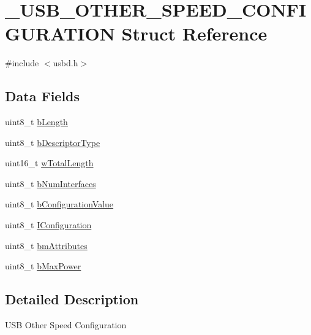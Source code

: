 \hypertarget{struct__USB__OTHER__SPEED__CONFIGURATION}{\section{\-\_\-\-U\-S\-B\-\_\-\-O\-T\-H\-E\-R\-\_\-\-S\-P\-E\-E\-D\-\_\-\-C\-O\-N\-F\-I\-G\-U\-R\-A\-T\-I\-O\-N Struct Reference}
\label{struct__USB__OTHER__SPEED__CONFIGURATION}
}


{\ttfamily \#include $<$usbd.\-h$>$}

\subsection*{Data Fields}
\begin{DoxyCompactItemize}
\item 
uint8\-\_\-t \hyperlink{struct__USB__OTHER__SPEED__CONFIGURATION_a8c70170e1f5bfcc1d77a8357a254050c}{b\-Length}
\item 
uint8\-\_\-t \hyperlink{struct__USB__OTHER__SPEED__CONFIGURATION_ab8d0e53addf9904fbcad68ae45399805}{b\-Descriptor\-Type}
\item 
uint16\-\_\-t \hyperlink{struct__USB__OTHER__SPEED__CONFIGURATION_af624dbc10570cb8fbca7323c6bffcb70}{w\-Total\-Length}
\item 
uint8\-\_\-t \hyperlink{struct__USB__OTHER__SPEED__CONFIGURATION_a7ebb3afc825c1940c5ff1c5b2907ac38}{b\-Num\-Interfaces}
\item 
uint8\-\_\-t \hyperlink{struct__USB__OTHER__SPEED__CONFIGURATION_a7e753546b3365270dd7904762c1cd104}{b\-Configuration\-Value}
\item 
uint8\-\_\-t \hyperlink{struct__USB__OTHER__SPEED__CONFIGURATION_a69e71d4b33b56469a4388c07e811e390}{I\-Configuration}
\item 
uint8\-\_\-t \hyperlink{struct__USB__OTHER__SPEED__CONFIGURATION_a5891367fc0fe6631ae99f1751651f81b}{bm\-Attributes}
\item 
uint8\-\_\-t \hyperlink{struct__USB__OTHER__SPEED__CONFIGURATION_a3764f1ba43fd9b053b8e4675e306ff5b}{b\-Max\-Power}
\end{DoxyCompactItemize}


\subsection{Detailed Description}
U\-S\-B Other Speed Configuration 

